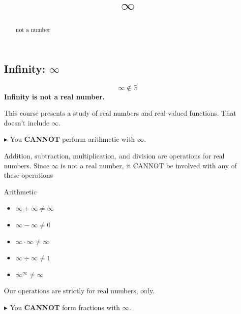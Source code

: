 \documentclass{ximera}
\title{$\infty$}
\begin{document}
\begin{abstract}
not a number
\end{abstract}
\maketitle




\subsection*{Infinity: $\infty$}


\begin{center}

\[ \infty \notin \mathbb{R} \]
\textbf{\textcolor{red!70!black}{Infinity is not a real number.}}

\end{center}




This course presents a study of real numbers and real-valued functions. That doesn't include $\infty$.




\textbf{\textcolor{red!70!darkgray}{$\blacktriangleright$ }} You \textbf{\textcolor{red!70!black}{CANNOT}} perform arithmetic with $\infty$.

Addition, subtraction, multiplication, and division are operations for real numbers.  Since $\infty$ is not a real number, it CANNOT be involved with any of these operations


\begin{example} Arithmetic


\begin{itemize}
\item $\infty + \infty \ne \infty$
\item $\infty - \infty \ne 0$
\item $\infty \cdot \infty \ne \infty$
\item $\infty \div \infty \ne 1$
\item $\infty^{\infty} \ne \infty$
\end{itemize}


\end{example}

Our operations are strictly for real numbers, only.









\textbf{\textcolor{red!70!darkgray}{$\blacktriangleright$ }} You \textbf{\textcolor{red!70!black}{CANNOT}} form fractions with $\infty$.
\end{document}
